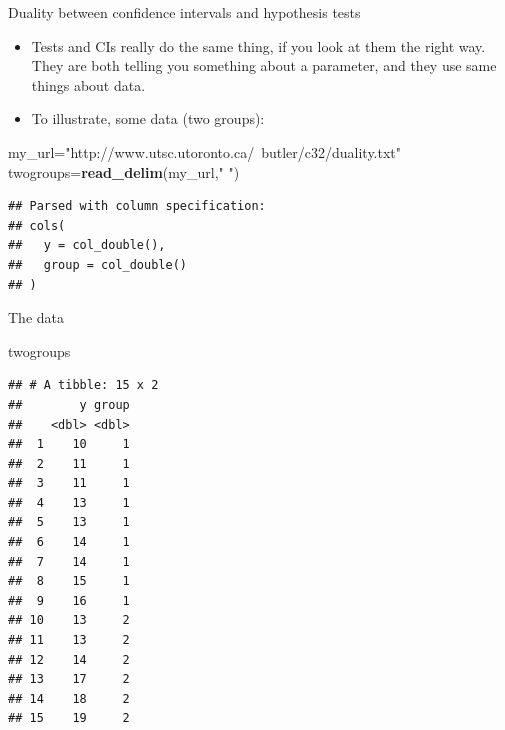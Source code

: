 \documentclass[
  ignorenonframetext,
]{beamer}
\newenvironment{Shaded}{\begin{snugshade}}{\end{snugshade}}
\newcommand{\KeywordTok}[1]{\textcolor[rgb]{0.13,0.29,0.53}{\textbf{#1}}}
\newcommand{\NormalTok}[1]{#1}
\newcommand{\StringTok}[1]{\textcolor[rgb]{0.31,0.60,0.02}{#1}}
\providecommand{\tightlist}{%
  \setlength{\itemsep}{0pt}\setlength{\parskip}{0pt}}
\begin{document}
\begin{frame}[fragile]{Duality between confidence intervals and
hypothesis tests}
\protect\hypertarget{duality-between-confidence-intervals-and-hypothesis-tests}{}

\begin{itemize}
\tightlist
\item
  Tests and CIs really do the same thing, if you look at them the right
  way. They are both telling you something about a parameter, and they
  use same things about data.
\item
  To illustrate, some data (two groups):
\end{itemize}

\begin{Shaded}
\begin{Highlighting}[]
\NormalTok{my_url=}\StringTok{"http://www.utsc.utoronto.ca/~butler/c32/duality.txt"}
\NormalTok{twogroups=}\KeywordTok{read_delim}\NormalTok{(my_url,}\StringTok{" "}\NormalTok{)}
\end{Highlighting}
\end{Shaded}

\begin{verbatim}
## Parsed with column specification:
## cols(
##   y = col_double(),
##   group = col_double()
## )
\end{verbatim}

\end{frame}

\begin{frame}[fragile]{The data}
\protect\hypertarget{the-data-2}{}

\footnotesize

\begin{Shaded}
\begin{Highlighting}[]
\NormalTok{twogroups}
\end{Highlighting}
\end{Shaded}

\begin{verbatim}
## # A tibble: 15 x 2
##        y group
##    <dbl> <dbl>
##  1    10     1
##  2    11     1
##  3    11     1
##  4    13     1
##  5    13     1
##  6    14     1
##  7    14     1
##  8    15     1
##  9    16     1
## 10    13     2
## 11    13     2
## 12    14     2
## 13    17     2
## 14    18     2
## 15    19     2
\end{verbatim}

\normalsize

\end{frame}
\end{document}
